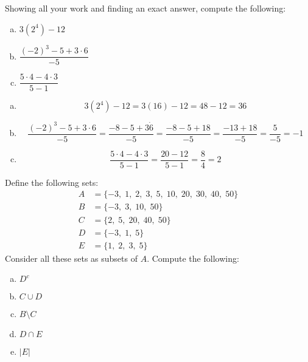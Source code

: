 \documentclass[12pt,letterpaper]{exam}
\begin{document}
\examtitle
{} 
\scores
\newpage

\begin{questions}

\newpage
\question[10] Showing all your work and finding an exact answer, compute the following:
	\begin{enumerate}[(a)]
	\item $3 (2^4) - 12$
	\item $\dfrac{(-2)^3 - 5 + 3 \cdot 6}{-5}$
	\item $\dfrac{5 \cdot 4 - 4 \cdot 3}{5 - 1}$
	\end{enumerate} \pspace

\sol
\begin{enumerate}[(a)]
\item 
	\[
	3 (2^4) - 12= 3(16) - 12= 48 - 12= 36
	\] \pspace

\item 
	\[
	\dfrac{(-2)^3 - 5 + 3 \cdot 6}{-5}= \dfrac{-8 - 5 + 3 \dot 6}{-5}= \dfrac{-8 - 5 + 18}{-5}= \dfrac{-13 + 18}{-5}= \dfrac{5}{-5}= -1
	\] \pspace

\item 
	\[
	\dfrac{5 \cdot 4 - 4 \cdot 3}{5 - 1}= \dfrac{20 - 12}{5 - 1}= \dfrac{8}{4}= 2
	\]
\end{enumerate}



\newpage
\question[10] Define the following sets:
	\[
	\begin{aligned}
	A&= \{ -3,\; 1, \; 2,\; 3,\; 5,\; 10,\; 20,\; 30,\; 40,\; 50 \} \\
	B&= \{ -3,\; 3,\; 10,\; 50 \} \\
	C&= \{ 2,\; 5,\; 20,\; 40,\; 50 \} \\
	D&= \{ -3,\; 1,\; 5 \} \\
	E&= \{ 1,\; 2,\; 3,\; 5 \}
	\end{aligned}
	\]
Consider all these sets as subsets of $A$. Compute the following:
	\begin{enumerate}[(a)]
	\item $D^c$
	\item $C \cup D$
	\item $B \setminus C$
	\item $D \cap E$
	\item $|E|$
	\end{enumerate} \pspace


\end{questions}
\end{document}
